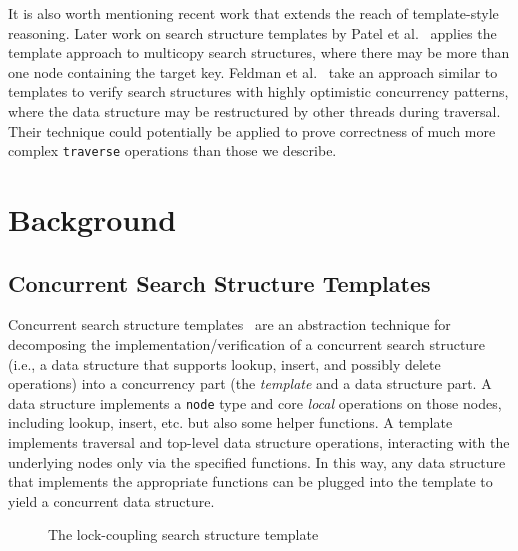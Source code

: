 \documentclass[sigplan,screen]{acmart}
\begin{document}
{%

It is also worth mentioning recent work that extends the reach of template-style reasoning. Later work on search structure templates by Patel et al.~\cite{template-multi} applies the template approach to multicopy search structures, where there may be more than one node containing the target key. Feldman et al.~\cite{feldman2020proving} take an approach similar to templates to verify search structures with highly optimistic concurrency patterns, where the data structure may be restructured by other threads during traversal. Their technique could potentially be applied to prove correctness of much more complex \lstinline{traverse} operations than those we describe.}

\section{Background}
\subsection{Concurrent Search Structure Templates}

Concurrent search structure templates~\cite{templates} are an abstraction technique for decomposing the implementation/verification of a concurrent search structure (i.e., a data structure that supports lookup, insert, and possibly delete operations) into a concurrency part (the \emph{template} and a data structure part. A data structure implements a \lstinline{node} type and core \emph{local} operations on those nodes, including lookup, insert, etc. but also some helper functions. A template implements traversal and top-level data structure operations, interacting with the underlying nodes only via the specified functions. In this way, any data structure that implements the appropriate functions can be plugged into the template to yield a concurrent data structure.
\begin{figure}[h]
	\begin{subfigure}[t]{0.45\textwidth}
		 
	\end{subfigure}
	\qquad
	\begin{subfigure}[t]{0.45\textwidth}
		 
	\end{subfigure}
	\caption{The lock-coupling search structure template}
	\label{template-ex}
\end{figure}
\end{document}
